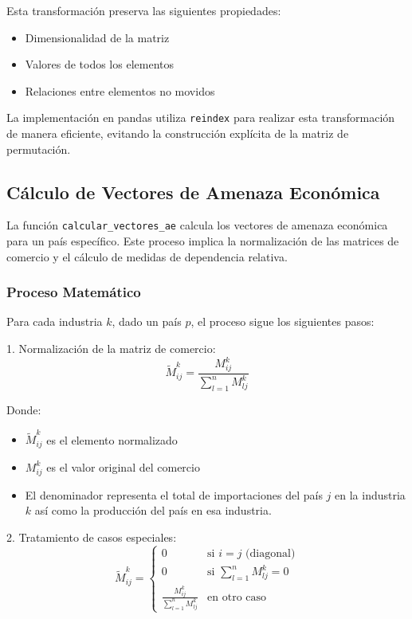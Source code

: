 \documentclass[11pt,a4paper]{article}
\begin{document}
Esta transformación preserva las siguientes propiedades:
\begin{itemize}
    \item Dimensionalidad de la matriz
    \item Valores de todos los elementos
    \item Relaciones entre elementos no movidos
\end{itemize}

La implementación en pandas utiliza \texttt{reindex} para realizar esta transformación de manera eficiente, evitando la construcción explícita de la matriz de permutación.


\subsection{Cálculo de Vectores de Amenaza Económica}

La función \texttt{calcular\_vectores\_ae} calcula los vectores de amenaza económica para un país específico. Este proceso implica la normalización de las matrices de comercio y el cálculo de medidas de dependencia relativa.

\subsubsection{Proceso Matemático}

Para cada industria $k$, dado un país $p$, el proceso sigue los siguientes pasos:

1. Normalización de la matriz de comercio:
\begin{equation}
\tilde{M}^k_{ij} = \frac{M^k_{ij}}{\sum_{l=1}^n M^k_{lj}}
\end{equation}

Donde:
\begin{itemize}
    \item $\tilde{M}^k_{ij}$ es el elemento normalizado
    \item $M^k_{ij}$ es el valor original del comercio
    \item El denominador representa el total de importaciones del país $j$ en la industria $k$ así como la producción del país en esa industria.
\end{itemize}

2. Tratamiento de casos especiales:
\begin{equation}
\tilde{M}^k_{ij} = \begin{cases}
0 & \text{si } i = j \text{ (diagonal)} \\
0 & \text{si } \sum_{l=1}^n M^k_{lj} = 0 \\
\frac{M^k_{ij}}{\sum_{l=1}^n M^k_{lj}} & \text{en otro caso}
\end{cases}
\end{equation}
\end{document}
